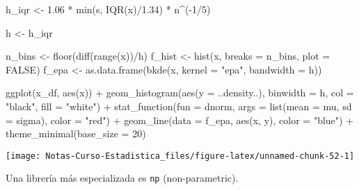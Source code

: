 \documentclass[
  12pt,
]{book}
\newenvironment{Shaded}{\begin{snugshade}}{\end{snugshade}}
\newcommand{\AttributeTok}[1]{\textcolor[rgb]{0.77,0.63,0.00}{#1}}
\newcommand{\ConstantTok}[1]{\textcolor[rgb]{0.00,0.00,0.00}{#1}}
\newcommand{\DecValTok}[1]{\textcolor[rgb]{0.00,0.00,0.81}{#1}}
\newcommand{\FloatTok}[1]{\textcolor[rgb]{0.00,0.00,0.81}{#1}}
\newcommand{\FunctionTok}[1]{\textcolor[rgb]{0.00,0.00,0.00}{#1}}
\newcommand{\NormalTok}[1]{#1}
\newcommand{\OtherTok}[1]{\textcolor[rgb]{0.56,0.35,0.01}{#1}}
\newcommand{\SpecialCharTok}[1]{\textcolor[rgb]{0.00,0.00,0.00}{#1}}
\newcommand{\StringTok}[1]{\textcolor[rgb]{0.31,0.60,0.02}{#1}}
\theoremstyle{definition}
\theoremstyle{definition}
\theoremstyle{definition}
\theoremstyle{definition}
\theoremstyle{remark}
\begin{document}
\begin{Shaded}
\begin{Highlighting}[]
\NormalTok{h\_iqr }\OtherTok{\textless{}{-}} \FloatTok{1.06} \SpecialCharTok{*} \FunctionTok{min}\NormalTok{(s, }\FunctionTok{IQR}\NormalTok{(x)}\SpecialCharTok{/}\FloatTok{1.34}\NormalTok{) }\SpecialCharTok{*}\NormalTok{ n}\SpecialCharTok{\^{}}\NormalTok{(}\SpecialCharTok{{-}}\DecValTok{1}\SpecialCharTok{/}\DecValTok{5}\NormalTok{)}

\NormalTok{h }\OtherTok{\textless{}{-}}\NormalTok{ h\_iqr}

\NormalTok{n\_bins }\OtherTok{\textless{}{-}} \FunctionTok{floor}\NormalTok{(}\FunctionTok{diff}\NormalTok{(}\FunctionTok{range}\NormalTok{(x))}\SpecialCharTok{/}\NormalTok{h)}
\NormalTok{f\_hist }\OtherTok{\textless{}{-}} \FunctionTok{hist}\NormalTok{(x, }\AttributeTok{breaks =}\NormalTok{ n\_bins, }\AttributeTok{plot =} \ConstantTok{FALSE}\NormalTok{)}
\NormalTok{f\_epa }\OtherTok{\textless{}{-}} \FunctionTok{as.data.frame}\NormalTok{(}\FunctionTok{bkde}\NormalTok{(x, }\AttributeTok{kernel =} \StringTok{"epa"}\NormalTok{, }\AttributeTok{bandwidth =}\NormalTok{ h))}

\FunctionTok{ggplot}\NormalTok{(x\_df, }\FunctionTok{aes}\NormalTok{(x)) }\SpecialCharTok{+} \FunctionTok{geom\_histogram}\NormalTok{(}\FunctionTok{aes}\NormalTok{(}\AttributeTok{y =}\NormalTok{ ..density..),}
    \AttributeTok{binwidth =}\NormalTok{ h, }\AttributeTok{col =} \StringTok{"black"}\NormalTok{, }\AttributeTok{fill =} \StringTok{"white"}\NormalTok{) }\SpecialCharTok{+}
    \FunctionTok{stat\_function}\NormalTok{(}\AttributeTok{fun =}\NormalTok{ dnorm, }\AttributeTok{args =} \FunctionTok{list}\NormalTok{(}\AttributeTok{mean =}\NormalTok{ mu,}
        \AttributeTok{sd =}\NormalTok{ sigma), }\AttributeTok{color =} \StringTok{"red"}\NormalTok{) }\SpecialCharTok{+} \FunctionTok{geom\_line}\NormalTok{(}\AttributeTok{data =}\NormalTok{ f\_epa,}
    \FunctionTok{aes}\NormalTok{(x, y), }\AttributeTok{color =} \StringTok{"blue"}\NormalTok{) }\SpecialCharTok{+} \FunctionTok{theme\_minimal}\NormalTok{(}\AttributeTok{base\_size =} \DecValTok{20}\NormalTok{)}
\end{Highlighting}
\end{Shaded}

\begin{center}\texttt{[image: Notas-Curso-Estadistica\_files/figure-latex/unnamed-chunk-52-1]} \end{center}

Una librería más especializada es \texttt{np} (non-parametric).
\end{document}
